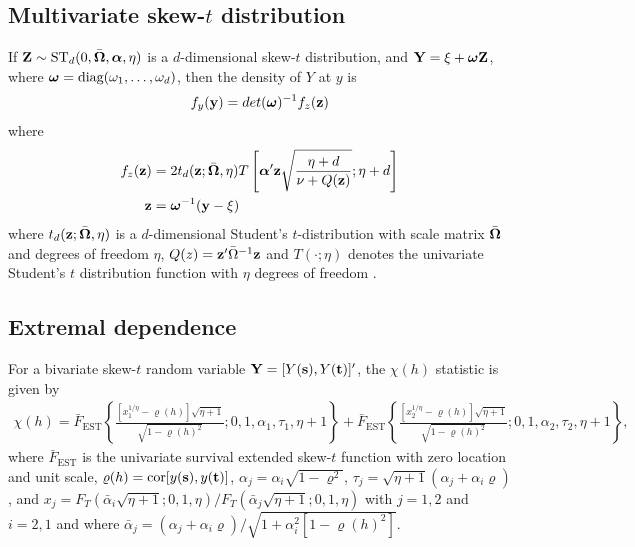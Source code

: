 \subsection*{Multivariate skew-$t$ distribution}
If $\mathbf{Z} \sim \text{ST}_d(0, \bar{\mbox{\boldmath $\Omega$}}, \mbox{\boldmath $\alpha$}, \eta)$ is a $d$-dimensional skew-$t$ distribution, and $\mathbf{Y} = \xi + \mbox{\boldmath $\omega$} \mathbf{Z}$, where $\mbox{\boldmath $\omega$} = \text{diag}(\omega_1, \ldots, \omega_d)$, then the density of $Y$ at $y$ is
\begin{align}
  f_y(\mathbf{y}) = det(\mbox{\boldmath $\omega$})^{-1} f_z(\mathbf{z})
\end{align}
where
\begin{align}
  f_z(\mathbf{z}) &= 2 t_d(\mathbf{z}; \bar{\mbox{\boldmath $\Omega$}}, \eta) T \left[ \mbox{\boldmath $\alpha$}^\prime \mathbf{z} \sqrt{ \frac{\eta + d}{\nu + Q(\mathbf{z})} }; \eta + d\right] \\
  \mathbf{z} &= \mbox{\boldmath $\omega$}^{-1}(\mathbf{y} - \xi)
\end{align}
where $t_d(\mathbf{z}; \bar{\mbox{\boldmath $\Omega$}}, \eta)$ is a $d$-dimensional Student's $t$-distribution with scale matrix $\bar{\mbox{\boldmath $\Omega$}}$ and degrees of freedom $\eta$, $Q(z) = \mathbf{z}^\prime \bar{\Omega}^{-1}\mathbf{z}$ and $T(\cdot; \eta)$ denotes the univariate Student's $t$ distribution function with $\eta$ degrees of freedom \citep{Azzalini2014}.

\subsection*{Extremal dependence}
For a bivariate skew-$t$ random variable $\mathbf{Y} = [Y(\mathbf{s}), Y(\mathbf{t})]^\prime$, the $\chi(h)$ statistic \citep{Padoan2011} is given by
\begin{align} \label{steq:chiskew-t}
  \chi(h) = \bar{F}_{\text{EST}}\left\{ \frac{[x_1^{1 / \eta} - \varrho(h)] \sqrt{\eta + 1} }{\sqrt{1 - \varrho(h)^2}}; 0, 1, \alpha_1, \tau_1, \eta + 1 \right\} + \bar{F}_{\text{EST}}\left\{ \frac{ [x_2^{1 / \eta} - \varrho(h)] \sqrt{\eta + 1} }{ \sqrt{1 - \varrho(h)^2} }; 0, 1, \alpha_2, \tau_2, \eta + 1 \right\},
\end{align}
where $\bar{F}_{\text{EST}}$ is the univariate survival extended skew-$t$ function with zero location and unit scale, \hbox{$\varrho(h) = \text{cor}[y(\mathbf{s}), y(\mathbf{t})]$}, $\alpha_j = \alpha_i \sqrt{1 - \varrho^2}$, $\tau_j = \sqrt{\eta + 1}(\alpha_j + \alpha_i \varrho)$, and $x_j = F_T(\bar{\alpha}_i \sqrt{\eta + 1}; 0, 1, \eta) / F_T(\bar{\alpha}_j \sqrt{\eta + 1}; 0, 1, \eta)$ with $j = 1, 2$ and $i = 2, 1$ and where $\bar{\alpha}_j = (\alpha_j + \alpha_i \varrho) / \sqrt{ 1 + \alpha_i^2 [1 - \varrho(h)^2]}$.

